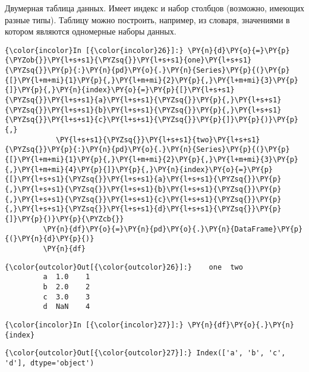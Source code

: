 Двумерная таблица данных. Имеет индекс и набор столбцов (возможно,
имеющих разные типы). Таблицу можно построить, например, из словаря,
значениями в котором являются одномерные наборы данных.

    \begin{Verbatim}[commandchars=\\\{\}]
{\color{incolor}In [{\color{incolor}26}]:} \PY{n}{d}\PY{o}{=}\PY{p}{\PYZob{}}\PY{l+s+s1}{\PYZsq{}}\PY{l+s+s1}{one}\PY{l+s+s1}{\PYZsq{}}\PY{p}{:}\PY{n}{pd}\PY{o}{.}\PY{n}{Series}\PY{p}{(}\PY{p}{[}\PY{l+m+mi}{1}\PY{p}{,}\PY{l+m+mi}{2}\PY{p}{,}\PY{l+m+mi}{3}\PY{p}{]}\PY{p}{,}\PY{n}{index}\PY{o}{=}\PY{p}{[}\PY{l+s+s1}{\PYZsq{}}\PY{l+s+s1}{a}\PY{l+s+s1}{\PYZsq{}}\PY{p}{,}\PY{l+s+s1}{\PYZsq{}}\PY{l+s+s1}{b}\PY{l+s+s1}{\PYZsq{}}\PY{p}{,}\PY{l+s+s1}{\PYZsq{}}\PY{l+s+s1}{c}\PY{l+s+s1}{\PYZsq{}}\PY{p}{]}\PY{p}{)}\PY{p}{,}
            \PY{l+s+s1}{\PYZsq{}}\PY{l+s+s1}{two}\PY{l+s+s1}{\PYZsq{}}\PY{p}{:}\PY{n}{pd}\PY{o}{.}\PY{n}{Series}\PY{p}{(}\PY{p}{[}\PY{l+m+mi}{1}\PY{p}{,}\PY{l+m+mi}{2}\PY{p}{,}\PY{l+m+mi}{3}\PY{p}{,}\PY{l+m+mi}{4}\PY{p}{]}\PY{p}{,}\PY{n}{index}\PY{o}{=}\PY{p}{[}\PY{l+s+s1}{\PYZsq{}}\PY{l+s+s1}{a}\PY{l+s+s1}{\PYZsq{}}\PY{p}{,}\PY{l+s+s1}{\PYZsq{}}\PY{l+s+s1}{b}\PY{l+s+s1}{\PYZsq{}}\PY{p}{,}\PY{l+s+s1}{\PYZsq{}}\PY{l+s+s1}{c}\PY{l+s+s1}{\PYZsq{}}\PY{p}{,}\PY{l+s+s1}{\PYZsq{}}\PY{l+s+s1}{d}\PY{l+s+s1}{\PYZsq{}}\PY{p}{]}\PY{p}{)}\PY{p}{\PYZcb{}}
         \PY{n}{df}\PY{o}{=}\PY{n}{pd}\PY{o}{.}\PY{n}{DataFrame}\PY{p}{(}\PY{n}{d}\PY{p}{)}
         \PY{n}{df}
\end{Verbatim}

            \begin{Verbatim}[commandchars=\\\{\}]
{\color{outcolor}Out[{\color{outcolor}26}]:}    one  two
         a  1.0    1
         b  2.0    2
         c  3.0    3
         d  NaN    4
\end{Verbatim}
        
    \begin{Verbatim}[commandchars=\\\{\}]
{\color{incolor}In [{\color{incolor}27}]:} \PY{n}{df}\PY{o}{.}\PY{n}{index}
\end{Verbatim}

            \begin{Verbatim}[commandchars=\\\{\}]
{\color{outcolor}Out[{\color{outcolor}27}]:} Index(['a', 'b', 'c', 'd'], dtype='object')
\end{Verbatim}
        
